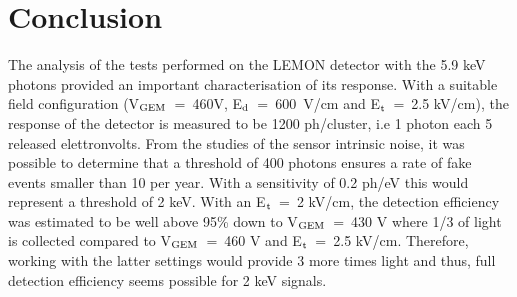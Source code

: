 \documentclass[a4paper]{jpconf}
\begin{document}
\section{Conclusion}

The analysis of the tests performed on the LEMON detector with the 5.9
keV photons provided an important characterisation of its
response. With a suitable field configuration (V$_{\rm GEM}$~=~460V,
E$_{\rm d}$~=~600~V/cm and E$_{\rm t}$~=~2.5 kV/cm), the response of
the detector is measured to be 1200 ph/cluster, i.e 1 photon each 5
released elettronvolts.  From the studies of the sensor intrinsic
noise, it was possible to determine that a threshold of 400 photons
ensures a rate of fake events smaller than 10 per year. With a
sensitivity of 0.2 ph/eV this would represent a threshold of 2 keV.
With an E$_{\rm t}$~=~2 kV/cm, the detection efficiency was estimated
to be well above 95\% down to V$_{\rm GEM}$~=~430 V where 1/3 of light
is collected compared to V$_{\rm GEM}$~=~460 V and E$_{\rm t}$~=~2.5
kV/cm.  Therefore, working with the latter settings would provide 3
more times light and thus, full detection efficiency seems possible
for 2 keV signals.

{}

\end{document}
